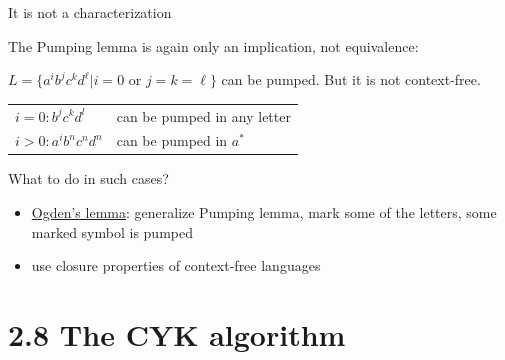 \documentclass[handout]{beamer}
\begin{document}
\begin{frame}{It is not a characterization}

	The Pumping lemma is again only an implication, not equivalence:

	\begin{example}
		$L=\{a^ib^jc^kd^\ell| i=0 \text{ or } j=k=\ell\}$ can be pumped. But it is not context-free.
	\end{example}
		
	\begin{tabular}{l l}
		$i=0: b^jc^kd^l$ & can be pumped in any letter\\
		$i>0:a^ib^nc^nd^n$ & can be pumped in $a^*$
	\end{tabular}

	\medskip
	
	What to do in such cases?
	\begin{itemize}
		\item \href{https://is.cuni.cz/studium/predmety/index.php?do=predmet&kod=NTIN071}{\alert{Ogden's lemma}}: generalize Pumping lemma, mark some of the letters, some marked symbol is pumped
		\item use closure properties of context-free languages
	\end{itemize}

\end{frame}


\section{2.8 The CYK algorithm}
\end{document}
